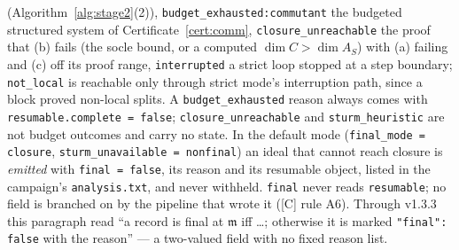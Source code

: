 \documentclass[11pt]{article}
\theoremstyle{remark}
\newcommand{\m}{\mathfrak{m}}
\begin{document}
(Algorithm~\ref{alg:stage2}(2)), \texttt{budget\_exhausted:commutant} the budgeted structured
system of Certificate~\ref{cert:comm}, \texttt{closure\_unreachable} the proof that (b) fails
(the socle bound, or a computed $\dim C>\dim A_S$) with (a) failing and (c) off its proof range,
\texttt{interrupted} a strict loop stopped at a step boundary; \texttt{not\_local} is reachable
only through strict mode's interruption path, since a block proved non-local splits. A
\texttt{budget\_exhausted} reason always comes with \texttt{resumable.complete = false};
\texttt{closure\_unreachable} and \texttt{sturm\_heuristic} are not budget outcomes and carry no
state. In the default mode (\texttt{final\_mode = closure},
\texttt{sturm\_unavailable = nonfinal}) an ideal that cannot reach closure is \emph{emitted} with
\texttt{final = false}, its reason and its resumable object, listed in the campaign's
\texttt{analysis.txt}, and never withheld. \texttt{final} never reads \texttt{resumable}; no
field is branched on by the pipeline that wrote it ([C] rule A6). Through v1.3.3 this paragraph
read ``a record is final at $\m$ iff \ldots; otherwise it is marked \texttt{"final": false} with
the reason'' --- a two-valued field with no fixed reason list.
\end{document}
